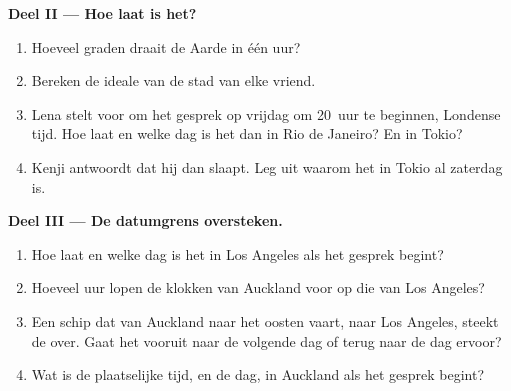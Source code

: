 \begin{problem}
\medskip
\noindent\textbf{Deel II --- Hoe laat is het?}
\begin{enumerate}[resume]
  \item Hoeveel graden draait de Aarde in één uur?
  \item Bereken de ideale  van de stad van elke vriend.
  \item Lena stelt voor om het gesprek op vrijdag om 20~uur te beginnen,
        Londense tijd. Hoe laat en welke dag is het dan in Rio de Janeiro?
        En in Tokio?
  \item Kenji antwoordt dat hij dan slaapt. Leg uit waarom het in Tokio
        al zaterdag is.
\end{enumerate}

\medskip
\noindent\textbf{Deel III --- De datumgrens oversteken.}
\begin{enumerate}[resume]
  \item Hoe laat en welke dag is het in Los Angeles als het gesprek begint?
  \item Hoeveel uur lopen de klokken van Auckland voor op die van Los
        Angeles?
  \item Een schip dat van Auckland naar het oosten vaart, naar Los Angeles,
        steekt de  over. Gaat het vooruit naar de volgende dag of
        terug naar de dag ervoor?
  \item Wat is de plaatselijke tijd, en de dag, in Auckland als het gesprek
        begint?
\end{enumerate}
\end{problem}
